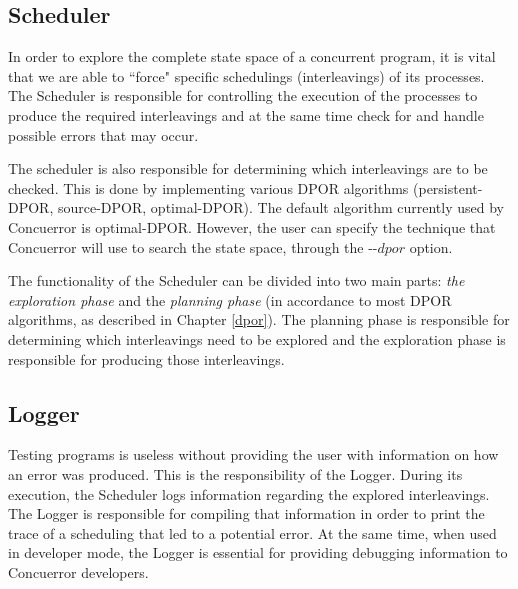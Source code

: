 \subsection{Scheduler}

In order to explore the complete state space of a concurrent program, it is vital that we are able to 
``force" specific schedulings (interleavings) of its processes. The Scheduler is responsible for controlling 
the execution of the processes to produce the required interleavings and at the same time
check for and handle possible errors that may occur.

The scheduler is also responsible for determining which interleavings are to be checked. This is done
by implementing various DPOR algorithms (persistent-DPOR, source-DPOR, optimal-DPOR). The default
algorithm currently used by Concuerror is optimal-DPOR. 
However, the user can specify the technique that Concuerror will use to search the state space, through the -{}-$dpor$ option.

The functionality of the Scheduler can be divided into two main parts: \textit{the exploration phase} and
the \textit{planning phase} (in accordance to most DPOR algorithms, as described in Chapter \ref{dpor}).
The planning phase is responsible for determining which interleavings need to be explored and the
exploration phase is responsible for producing those interleavings.

\subsection{Logger}

Testing programs is useless without providing the user with information on how an error was produced. This is
the responsibility of the Logger. During its execution, the Scheduler logs information regarding the explored interleavings. 
The Logger is responsible for compiling that information in order to print the trace of a scheduling that led to a
potential error. At the same time, when used in developer mode, the Logger is essential for providing debugging 
information to Concuerror developers.
